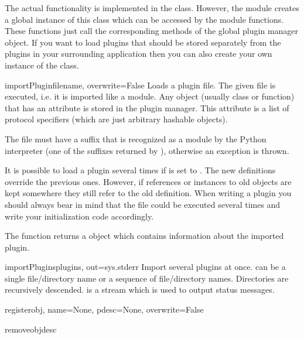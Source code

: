 The actual functionality is implemented in the 
class. However, the module creates a global instance of this class
which can be accessed by the module functions. These functions just
call the corresponding methods of the global plugin manager object.
If you want to load plugins that should be stored separately from
the plugins in your surrounding application then you can also create
your own instance of the  class.

\begin{funcdesc}{importPlugin}{filename, overwrite=False}
Loads a plugin file. The given file is executed, i.e. it is imported
like a module. Any object (usually class or function) that has an
attribute  is stored in the plugin manager. This
attribute is a list of protocol specifiers (which are just arbitrary
hashable objects).

The file must have a suffix that is recognized as a module by the
Python interpreter (one of the suffixes returned by
), otherwise an 
exception is thrown.

It is possible to load a plugin several times if  is set to
. The new definitions override the previous ones. However, if
references or instances to old objects are kept somewhere they still
refer to the old definition. When writing a plugin you should always
bear in mind that the file could be executed several times and write
your initialization code accordingly.

The function returns a  object which contains
information about the imported plugin.
\end{funcdesc}

\begin{funcdesc}{importPlugins}{plugins, out=sys.stderr}
Import several plugins at once.  can be a single
file/directory name or a sequence of file/directory names. Directories
are recursively descended.
 is a stream which is used to output status messages.
\end{funcdesc}

\begin{funcdesc}{register}{obj, name=None, pdesc=None, overwrite=False}
\end{funcdesc}

\begin{funcdesc}{remove}{objdesc}
\end{funcdesc}

